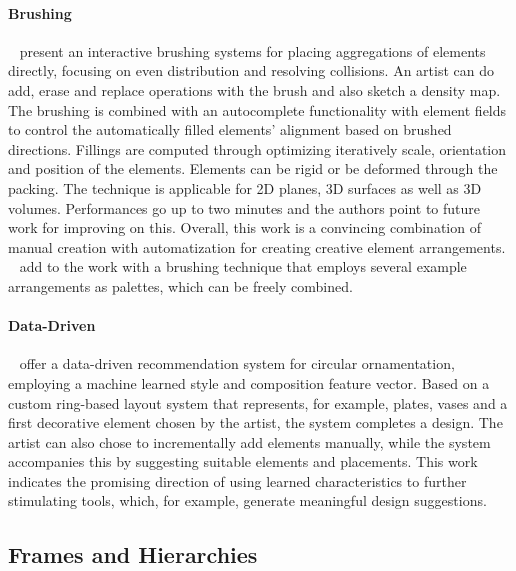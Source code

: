 \paragraph*{Brushing}
\label{para:analysis_element_arrangements_sketching}
\citeauthor*{hsu_2020_aef}~\cite{hsu_2020_aef}
present an interactive brushing systems for placing aggregations of elements directly, focusing on even distribution and resolving collisions. An artist can do add, erase and replace operations with the brush and also sketch a density map. The brushing is combined with an autocomplete functionality with element fields to control the automatically filled elements' alignment based on brushed directions. Fillings are computed through optimizing iteratively scale, orientation and position of the elements. Elements can be rigid or be deformed through the packing. The technique is applicable for 2D planes, 3D surfaces as well as 3D volumes. Performances go up to two minutes and the authors point to future work for improving on this. Overall, this work is a convincing combination of manual creation with automatization for creating creative element arrangements. \citeauthor*{davison_2019_ief}~\cite{davison_2019_ief} add to the work with a brushing technique that employs several example arrangements as palettes, which can be freely combined. 


\paragraph*{Data-Driven}
\label{para:analysis_element_arrangements_datadriven}

\citeauthor*{phan_2016_ple}~\cite{phan_2016_ple} offer a data-driven recommendation system for circular ornamentation, employing a machine learned style and composition feature vector. Based on a custom ring-based layout system that represents, for example, plates, vases and a first decorative element chosen by the artist, the system completes a design. The artist can also chose to incrementally add elements manually, while the system accompanies this by suggesting suitable elements and placements. This work indicates the promising direction of using learned characteristics to further stimulating tools, which, for example, generate meaningful design suggestions.



\subsection{Frames and Hierarchies}
\label{subsec:analysis_frames_and_hierarchies}

